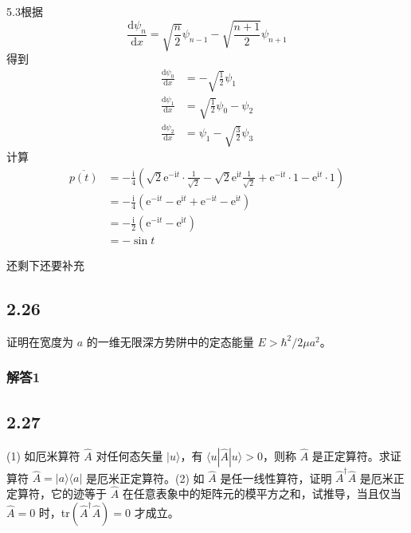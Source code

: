 5.3根据
\begin{equation}
    \frac{\mathrm{d}\psi _n}{\mathrm{d}x}=\sqrt{\frac{n}{2}}\psi _{n-1}-\sqrt{\frac{n+1}{2}}\psi _{n+1}
\end{equation}
得到
\begin{equation}
    \begin{aligned}
        \frac{\mathrm{d}\psi _0}{\mathrm{d}x}&=-\sqrt{\frac{1}{2}}\psi _1
\\
\frac{\mathrm{d}\psi _1}{\mathrm{d}x}&=\sqrt{\frac{1}{2}}\psi _0-\psi _2
\\
\frac{\mathrm{d}\psi _2}{\mathrm{d}x}&=\psi _1-\sqrt{\frac{3}{2}}\psi _3
    \end{aligned}
\end{equation}
计算
\begin{equation}
    \begin{aligned}
        \overline{p(t)}&=-\frac{\mathrm{i}}{4}\left( \sqrt{2}\mathrm{e}^{-\mathrm{i}t}\cdot \frac{1}{\sqrt{2}}-\sqrt{2}\mathrm{e}^{\mathrm{i}t}\frac{1}{\sqrt{2}}+\mathrm{e}^{-\mathrm{i}t}\cdot 1-\mathrm{e}^{\mathrm{i}t}\cdot 1 \right) 
\\
&=-\frac{\mathrm{i}}{4}\left( \mathrm{e}^{-\mathrm{i}t}-\mathrm{e}^{\mathrm{i}t}+\mathrm{e}^{-\mathrm{i}t}-\mathrm{e}^{\mathrm{i}t} \right) 
\\
&=-\frac{\mathrm{i}}{2}\left( \mathrm{e}^{-\mathrm{i}t}-\mathrm{e}^{\mathrm{i}t} \right) 
\\
&=-\sin t
    \end{aligned}
\end{equation}


还剩下还要补充



\newpage
\subsection{2.26}
证明在宽度为 $a$ 的一维无限深方势阱中的定态能量 $E > \hbar^2 / 2 \mu a^2$。

\subsubsection{解答1}


\newpage
\subsection{2.27}
(1) 如厄米算符 $\hat{A}$ 对任何态矢量 $|u\rangle$，有 $\langle u|\hat{A}|u\rangle > 0$，则称 $\hat{A}$ 是正定算符。求证算符 $\hat{A} = |a\rangle \langle a|$ 是厄米正定算符。(2) 如 $\hat{A}$ 是任一线性算符，证明 $\hat{A}^{\dagger} \hat{A}$ 是厄米正定算符，它的迹等于 $\hat{A}$ 在任意表象中的矩阵元的模平方之和，试推导，当且仅当 $\hat{A} = 0$ 时，tr$(\hat{A}^{\dagger} \hat{A}) = 0$ 才成立。

